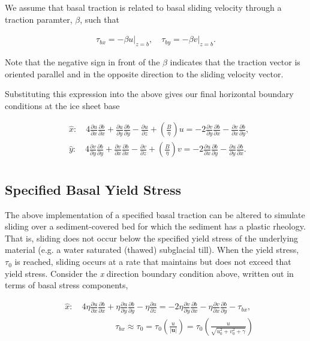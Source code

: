 We assume that basal traction is related to basal sliding velocity through a traction paramter, $\beta$, such that

\begin{align*}
\tau _{bx}=\left. -\beta u \right|_{z=b},\quad \tau _{by}=\left. -\beta v \right|_{z=b}.
\end{align*}

Note that the negative sign in front of the $\beta$ indicates that the traction vector is oriented parallel and in the opposite direction to the sliding velocity vector.

Substituting this expression into the above gives our final horizontal boundary conditions at the ice sheet base

\begin{align*}
  & \hat{x}:\quad 4\frac{\partial u}{\partial x}\frac{\partial b}{\partial x}+\frac{\partial u}{\partial y}\frac{\partial b}{\partial y}-\frac{\partial u}{\partial z}+\left( \frac{B}{\eta } \right)u=-2\frac{\partial v}{\partial y}\frac{\partial b}{\partial x}-\frac{\partial v}{\partial x}\frac{\partial b}{\partial y}, \\ 
 & \hat{y}:\quad 4\frac{\partial v}{\partial y}\frac{\partial b}{\partial y}+\frac{\partial v}{\partial x}\frac{\partial b}{\partial x}-\frac{\partial v}{\partial z}+\left( \frac{B}{\eta } \right)v=-2\frac{\partial u}{\partial x}\frac{\partial b}{\partial y}-\frac{\partial u}{\partial y}\frac{\partial b}{\partial x}. \\ 
\end{align*}

\subsection{Specified Basal Yield Stress}
The above implementation of a specified basal traction can be altered to simulate sliding over a sediment-covered bed for which the sediment has a plastic rheology. That is, sliding does not occur below the specified yield stress of the underlying material (e.g. a water saturated (thawed) subglacial till). When the yield stress, $\tau_0$ is reached, sliding occurs at a rate that maintains but does not exceed that yield stress. Consider the \textit{x} direction boundary condition above, written out in terms of basal stress components,

\begin{align*}
  & \hat{x}:\quad 4\eta \frac{\partial u}{\partial x}\frac{\partial b}{\partial x}+\eta \frac{\partial u}{\partial y}\frac{\partial b}{\partial y}-\eta \frac{\partial u}{\partial z}=-2\eta \frac{\partial v}{\partial y}\frac{\partial b}{\partial x}-\eta \frac{\partial v}{\partial x}\frac{\partial b}{\partial y}-\tau _{bx}, \\ 
 & \quad \quad \quad \quad \quad \quad \tau _{bx}\approx \tau _{0}=\tau _{0}\left( \frac{u}{\left| \mathbf{u} \right|} \right)=\tau _{0}\left( \frac{u}{\sqrt{u_{0}^{2}+v_{0}^{2}+\gamma }} \right) \\ 
\end{align*}

